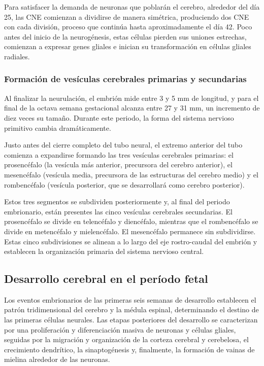 \documentclass[11pt,letterpaper]{report}
\begin{document}
Para satisfacer la demanda de neuronas que poblarán el cerebro, alrededor del
día 25, las CNE comienzan a dividirse de manera simétrica, produciendo dos
CNE con cada división, proceso que continúa hasta aproximadamente el día 42.
Poco antes del inicio de la neurogénesis, estas células pierden sus uniones
estrechas, comienzan a expresar genes gliales e inician su transformación en
células gliales radiales. \cite{Stiles2010}

\subsubsection{Formación de vesículas cerebrales primarias y secundarias}
Al finalizar la neurulación, el embrión mide entre 3 y 5 mm de longitud, y para
el final de la octava semana gestacional alcanza entre 27 y 31 mm, un
incremento de diez veces su tamaño. Durante este periodo, la forma del sistema
nervioso primitivo cambia dramáticamente. \cite{Stiles2010}

Justo antes del cierre completo del tubo neural, el extremo anterior del tubo
comienza a expandirse formando las tres vesículas cerebrales primarias: el
prosencéfalo (la vesícula más anterior, precursora del cerebro anterior), el
mesencéfalo (vesícula media, precursora de las estructuras del cerebro medio) y
el rombencéfalo (vesícula posterior, que se desarrollará como cerebro
posterior). \cite{Stiles2010}

Estos tres segmentos se subdividen posteriormente y, al final del periodo
embrionario, están presentes las cinco vesículas cerebrales secundarias. El
prosencéfalo se divide en telencéfalo y diencéfalo, mientras que el
rombencéfalo se divide en metencéfalo y mielencéfalo. El mesencéfalo permanece
sin subdividirse. Estas cinco subdivisiones se alinean a lo largo del eje
rostro-caudal del embrión y establecen la organización primaria del sistema
nervioso central. \cite{Stiles2010}

\subsection{Desarrollo cerebral en el período fetal}
Los eventos embrionarios de las primeras seis semanas de desarrollo establecen
el patrón tridimensional del cerebro y la médula espinal, determinando el
destino de las primeras células neurales. Las etapas posteriores del desarrollo
se caracterizan por una proliferación y diferenciación masiva de neuronas y
células gliales, seguidas por la migración y organización de la corteza
cerebral y cerebelosa, el crecimiento dendrítico, la sinaptogénesis y,
finalmente, la formación de vainas de mielina alrededor de las neuronas.
\cite{Polin124}
\end{document}
